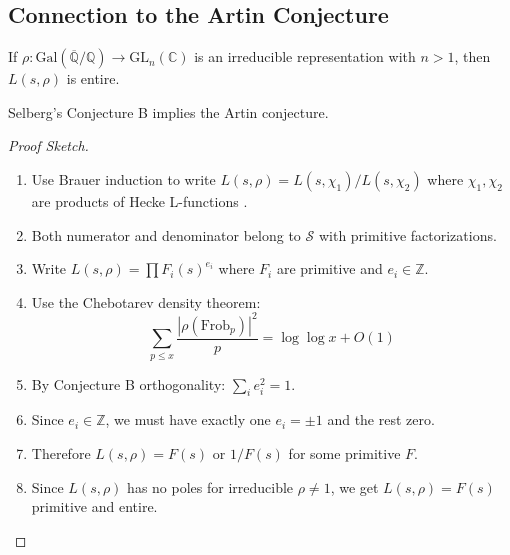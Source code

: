 \subsection{Connection to the Artin Conjecture}

\begin{conjecture}
If $\rho: \text{Gal}(\overline{\mathbb{Q}}/\mathbb{Q}) \to \text{GL}_n(\mathbb{C})$ is an irreducible representation with $n > 1$, then $L(s,\rho)$ is entire.
\end{conjecture}

\begin{theorem}
Selberg's Conjecture B implies the Artin conjecture.
\end{theorem}

\begin{proof}[Proof Sketch]
\begin{enumerate}
\item Use Brauer induction to write $L(s,\rho) = L(s,\chi_1)/L(s,\chi_2)$ where $\chi_1, \chi_2$ are products of Hecke L-functions \cite{langlands1976}.

\item Both numerator and denominator belong to $\mathcal{S}$ with primitive factorizations.

\item Write $L(s,\rho) = \prod F_i(s)^{e_i}$ where $F_i$ are primitive and $e_i \in \mathbb{Z}$.

\item Use the Chebotarev density theorem:
   \begin{equation}
   \sum_{p \leq x} \frac{|\rho(\text{Frob}_p)|^2}{p} = \log \log x + O(1)
   \end{equation}

\item By Conjecture B orthogonality: $\sum_i e_i^2 = 1$.

\item Since $e_i \in \mathbb{Z}$, we must have exactly one $e_i = \pm 1$ and the rest zero.

\item Therefore $L(s,\rho) = F(s)$ or $1/F(s)$ for some primitive $F$.

\item Since $L(s,\rho)$ has no poles for irreducible $\rho \neq 1$, we get $L(s,\rho) = F(s)$ primitive and entire.
\end{enumerate}
\end{proof}

